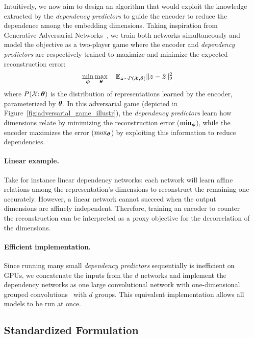 Intuitively, we now aim to design an algorithm that would exploit the knowledge extracted by the \textit{dependency predictors} to guide the encoder to reduce the dependence among the embedding dimensions. 
Taking inspiration from Generative Adversarial Networks~\citep{goodfellow2014generative}, we train both networks simultaneously and model the objective as a two-player game where the encoder and \textit{dependency predictors} are respectively trained to maximize and minimize the expected reconstruction error:
\begin{equation} \label{eq:minmax_game}
    \min_{{\bm{\phi}}} \max_{{\bm{\theta}}} \quad \mathbb{E}_{{\bm{z}}\sim P(\mathcal{X};{\bm{\theta}})} \lVert {\bm{z}} - \hat{{\bm{z}}} \rVert_2^2
\end{equation}
where $P(\mathcal{X};{\bm{\theta}})$ is the distribution of representations learned by the encoder, parameterized by ${\bm{\theta}}$. 
In this adversarial game (depicted in Figure~\ref{fig:adversarial_game_illustr}), the \textit{dependency predictors} learn how dimensions relate by minimizing the reconstruction error ($\min_{{\bm{\phi}}}$), while the encoder maximizes the error ($\max_{{\bm{\theta}}}$) by exploiting this information to reduce dependencies. 

\paragraph{Linear example.} Take for instance linear dependency networks: each network will learn affine relations among the representation's dimensions to reconstruct the remaining one accurately. 
However, a linear network cannot succeed when the output dimensions are affinely independent. 
Therefore, training an encoder to counter the reconstruction can be interpreted as a proxy objective for the decorrelation of the dimensions. 

\paragraph{Efficient implementation.} Since running many small \textit{dependency predictors} sequentially is inefficient on GPUs, we concatenate the inputs from the $d$ networks and implement the dependency networks as one large convolutional network with one-dimensional grouped convolutions~\citep{krizhevsky2012_alexnet} with $d$ groups. This equivalent implementation allows all models to be run at once.

\subsection{Standardized Formulation} \label{subsec:stdized_formulation}

